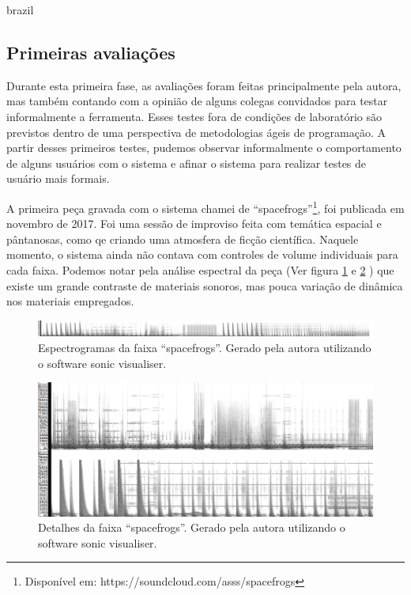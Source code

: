 \begin{otherlanguage*}{brazil}
\subsection{Primeiras avaliações}

Durante esta primeira fase, as avaliações foram feitas principalmente pela autora, mas também contando com a opinião de alguns colegas convidados para testar informalmente a ferramenta. Esses testes fora de condições de laboratório são previstos dentro de uma perspectiva de metodologias ágeis de programação. A partir desses primeiros testes, pudemos observar informalmente o comportamento de alguns usuários com o sistema e afinar o sistema para realizar testes de usuário mais formais. 

A primeira peça gravada com o sistema chamei de ``spacefrogs''\footnote{Disponível em: https://soundcloud.com/asss/spacefrogs}, foi publicada em novembro de 2017. Foi uma sessão de improviso feita com temática espacial e pântanosas, como qe criando uma atmosfera de ficção científica. Naquele momento, o sistema ainda não contava com controles de volume individuais para cada faixa. Podemos notar pela análise espectral da peça (Ver figura \ref{fig:spacefrogs} e \ref{fig:spacefrogsdt} ) que existe um grande contraste de materiais sonoros, mas pouca variação de dinâmica nos materiais empregados.

\begin{figure}
\centering
\includegraphics[width=1\textwidth]{pictures/cap4/spacefrogs_spectrogram}
\caption{Espectrogramas da faixa ``spacefrogs''. Gerado pela autora utilizando o software sonic visualiser.}
\label{fig:spacefrogs}
\end{figure}

\begin{figure}
\centering
\includegraphics[width=1\textwidth]{pictures/cap4/spacefrogs_spectrogram_dt}
\caption{Detalhes da faixa ``spacefrogs''. Gerado pela autora utilizando o software sonic visualiser.}
\label{fig:spacefrogsdt}
\end{figure}




\end{otherlanguage*}
